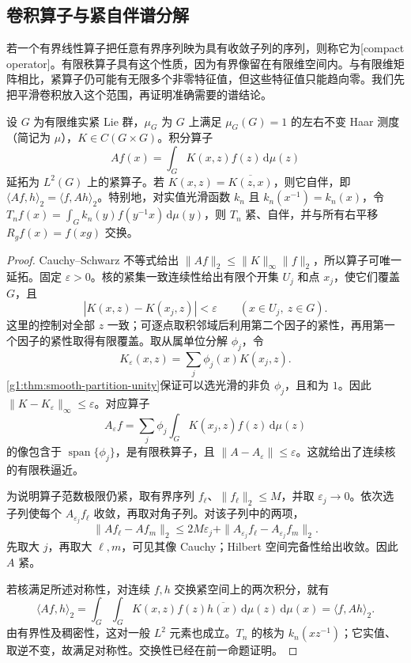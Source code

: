 \subsection{卷积算子与紧自伴谱分解}
\label{g1:subsec:2002:03}
若一个有界线性算子把任意有界序列映为具有收敛子列的序列，则称它为[compact operator]。有限秩算子具有这个性质，因为有界像留在有限维空间内。与有限维矩阵相比，紧算子仍可能有无限多个非零特征值，但这些特征值只能趋向零。我们先把平滑卷积放入这个范围，再证明准确需要的谱结论。

\begin{lemma}\label{g1:lem:continuous-kernel-compact}
	设 \(G\) 为有限维实紧 Lie 群，\(\mu_G\) 为 \(G\) 上满足 \(\mu_G(G)=1\) 的左右不变 Haar 测度（简记为 \(\mu\)），\(K\in C(G\times G)\)。积分算子
	\[
		Af(x)=\int_GK(x,z)f(z)\,\mathrm{d}\mu(z)
	\]
	延拓为 \(L^2(G)\) 上的紧算子。若 \(K(x,z)=\overline{K(z,x)}\)，则它自伴，即 \(\langle Af,h\rangle_2=\langle f,Ah\rangle_2\)。特别地，对实值光滑函数 \(k_n\) 且 \(k_n(x^{-1})=k_n(x)\)，令 \(T_nf(x)=\int_G k_n(y)f(y^{-1}x)\,\mathrm{d}\mu(y)\)，则 \(T_n\) 紧、自伴，并与所有右平移 \(R_gf(x)=f(xg)\) 交换。
\end{lemma}
\begin{proof}
	Cauchy--Schwarz 不等式给出 \(\|Af\|_2\le\|K\|_\infty\|f\|_2\)，所以算子可唯一延拓。固定 \(\varepsilon>0\)。核的紧集一致连续性给出有限个开集 \(U_j\) 和点 \(x_j\)，使它们覆盖 \(G\)，且
	\[
		|K(x,z)-K(x_j,z)|<\varepsilon
		\qquad(x\in U_j,\ z\in G).
	\]
	这里的控制对全部 \(z\) 一致；可逐点取积邻域后利用第二个因子的紧性，再用第一个因子的紧性取得有限覆盖。取从属单位分解 \(\phi_j\)，令
	\[
		K_\varepsilon(x,z)=\sum_j\phi_j(x)K(x_j,z).
	\]
	\cref{g1:thm:smooth-partition-unity}保证可以选光滑的非负 \(\phi_j\)，且和为 \(1\)。因此 \(\|K-K_\varepsilon\|_\infty\le\varepsilon\)。对应算子
	\[
		A_\varepsilon f=\sum_j\phi_j
		\int_GK(x_j,z)f(z)\,\mathrm{d}\mu(z)
	\]
	的像包含于 \(\operatorname{span}\{\phi_j\}\)，是有限秩算子，且 \(\|A-A_\varepsilon\|\le\varepsilon\)。这就给出了连续核的有限秩逼近。

	为说明算子范数极限仍紧，取有界序列 \(f_\ell\)、\(\|f_\ell\|_2\le M\)，并取 \(\varepsilon_j\to0\)。依次选子列使每个 \(A_{\varepsilon_j}f_\ell\) 收敛，再取对角子列。对该子列中的两项，
	\[
		\|Af_\ell-Af_m\|_2
		\le2M\varepsilon_j+
		\|A_{\varepsilon_j}f_\ell-A_{\varepsilon_j}f_m\|_2.
	\]
	先取大 \(j\)，再取大 \(\ell,m\)，可见其像 Cauchy；Hilbert 空间完备性给出收敛。因此 \(A\) 紧。

	若核满足所述对称性，对连续 \(f,h\) 交换紧空间上的两次积分，就有
	\[
		\langle Af,h\rangle_2
		=\int_G\int_GK(x,z)f(z)\overline{h(x)}\,
		\mathrm{d}\mu(z)\,\mathrm{d}\mu(x)
		=\langle f,Ah\rangle_2.
	\]
	由有界性及稠密性，这对一般 \(L^2\) 元素也成立。\(T_n\) 的核为 \(k_n(xz^{-1})\)；它实值、取逆不变，故满足对称性。交换性已经在前一命题证明。
\end{proof}

